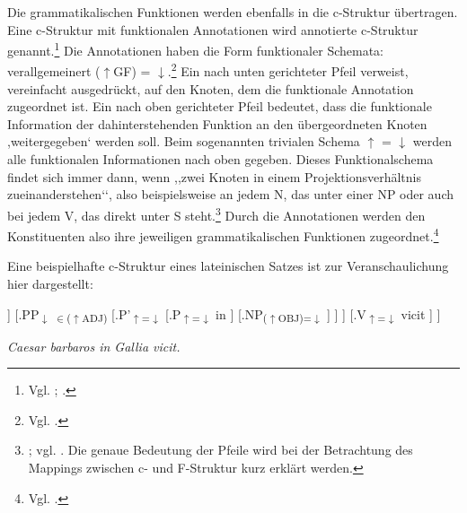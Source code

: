 \documentclass[12pt,a4paper]{article}
\begin{document}
Die grammatikalischen Funktionen werden ebenfalls in die c-Struktur übertragen. Eine c-Struktur mit funktionalen Annotationen wird annotierte c-Struktur genannt.\footnote{Vgl. \cite[69]{Falk}; \cite[22]{Rohrer}.} Die Annotationen haben die Form funktionaler Schemata: verallgemeinert ($\uparrow$GF) = $\downarrow$.\footnote{Vgl. \cite[33]{Rohrer}.} Ein nach unten gerichteter Pfeil verweist, vereinfacht ausgedrückt, auf den Knoten, dem die funktionale Annotation zugeordnet ist. Ein nach oben gerichteter Pfeil bedeutet, dass die funktionale Information der dahinterstehenden Funktion an den übergeordneten Knoten ,weitergegeben‘ werden soll. Beim sogenannten trivialen Schema $\uparrow$ = $\downarrow$ werden alle funktionalen Informationen nach oben gegeben. Dieses Funktionalschema findet sich immer dann, wenn ,,zwei Knoten in einem Projektionsverhältnis zueinanderstehen‘‘, also beispielsweise an jedem N, das unter einer NP oder auch bei jedem V, das direkt unter S steht.\footnote{\cite[28]{Skript}; vgl. \cite[25; 33]{Rohrer}. Die genaue Bedeutung der Pfeile wird bei der Betrachtung des Mappings zwischen c- und F-Struktur kurz erklärt werden.} Durch die Annotationen werden den Konstituenten also ihre jeweiligen grammatikalischen Funktionen zugeordnet.\footnote{Vgl. \cite[28]{Skript}.}

Eine beispielhafte c-Struktur eines lateinischen Satzes ist zur Veranschaulichung hier dargestellt:

\begin{singlespace}
\Tree [.S 
		[.{NP\textsubscript{($\uparrow$OBJ)=$\downarrow$}}
			[.N\textsubscript{$\uparrow$=$\downarrow$} barbaros ]
		]							
		[.{PP\textsubscript{$\downarrow$ $\in$($\uparrow$ADJ)}}
			[.P'\textsubscript{$\uparrow$=$\downarrow$}						
				[.P\textsubscript{$\uparrow$=$\downarrow$} in ]
				[.{NP\textsubscript{($\uparrow$OBJ)=$\downarrow$}} ]
			]
        ] 	
        [.V\textsubscript{$\uparrow$=$\downarrow$} vicit ]						
	]
\end{singlespace}

\textit{Caesar barbaros in Gallia vicit.} \\
\end{document}

